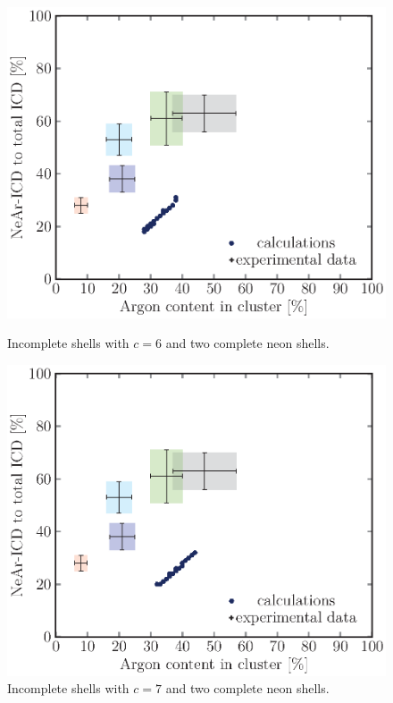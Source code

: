 \begin{figure}[!h]
\begin{minipage}{0.48\textwidth}
    \centering
    \includegraphics[scale=0.5]{pics/incompl02_06.ps}
    \caption{Incomplete shells with $c=6$ and two complete neon shells.}
    \label{incompl01_06_2neon}
\end{minipage}
\hfill
\begin{minipage}{0.48\textwidth}
    \centering
    \includegraphics[scale=0.5]{pics/incompl02_07.ps}
    \caption{Incomplete shells with $c=7$ and two complete neon shells.}
    \label{incompl01_07_2neon}
\end{minipage}
\end{figure}

